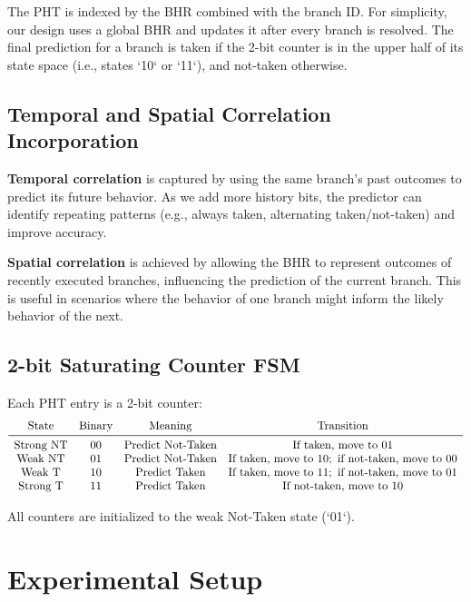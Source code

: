 \documentclass[12pt,letterpaper]{article}
\begin{document}
	The PHT is indexed by the BHR combined with the branch ID. For simplicity, our design uses a global BHR and updates it after every branch is resolved. The final prediction for a branch is taken if the 2-bit counter is in the upper half of its state space (i.e., states `10` or `11`), and not-taken otherwise.
	
	\subsection{Temporal and Spatial Correlation Incorporation}
	\textbf{Temporal correlation} is captured by using the same branch's past outcomes to predict its future behavior. As we add more history bits, the predictor can identify repeating patterns (e.g., always taken, alternating taken/not-taken) and improve accuracy.
	
	\textbf{Spatial correlation} is achieved by allowing the BHR to represent outcomes of recently executed branches, influencing the prediction of the current branch. This is useful in scenarios where the behavior of one branch might inform the likely behavior of the next.
	
	\subsection{2-bit Saturating Counter FSM}
	Each PHT entry is a 2-bit counter:
	\[
	\begin{array}{cccc}
		\text{State} & \text{Binary} & \text{Meaning} & \text{Transition}\\ \midrule
		\text{Strong NT} & 00 & \text{Predict Not-Taken} & \text{If taken, move to }01 \\
		\text{Weak NT} & 01 & \text{Predict Not-Taken} & \text{If taken, move to }10; \text{ if not-taken, move to }00\\
		\text{Weak T} & 10 & \text{Predict Taken} & \text{If taken, move to }11; \text{ if not-taken, move to }01\\
		\text{Strong T} & 11 & \text{Predict Taken} & \text{If not-taken, move to }10
	\end{array}
	\]
	
	All counters are initialized to the weak Not-Taken state (`01`).
	
	\section{Experimental Setup}
\end{document}
